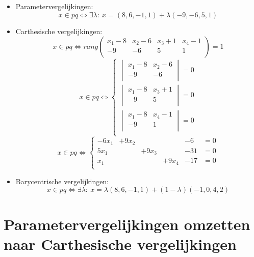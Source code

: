 \documentclass[main.tex]{subfiles}
\begin{document}
\begin{itemize}
\item Parametervergelijkingen:
  \[
  x\in pq \Leftrightarrow \exists \lambda:\ 
  x = (8,6,-1,1) + \lambda (-9,-6,5,1)
  \]
\item Carthesische vergelijkingen:
  \[
  x \in pq \Leftrightarrow
  rang
  \begin{pmatrix}
    x_{1}-8 & x_{2}-6 & x_{3}+1 & x_{4}-1\\
    -9 & -6 & 5 & 1\\
  \end{pmatrix}
  =1
  \]
  \[
  x \in pq \Leftrightarrow
  \left\{
  \begin{array}{c}
    \begin{vmatrix}
      x_{1}-8 & x_{2}-6\\
      -9 & -6\\
    \end{vmatrix}
    =0\\
    \begin{vmatrix}
      x_{1}-8 & x_{3}+1\\
      -9 & 5\\
    \end{vmatrix}
    =0\\
    \begin{vmatrix}
      x_{1}-8 & x_{4}-1\\
      -9 & 1\\
    \end{vmatrix}
    =0\\
  \end{array}
  \right.
  \]
  \[ 
  x \in pq \Leftrightarrow
  \left\{
    \begin{array}{ccccccc}
      -6x_{1} &+9x_{2} &        &       & -6 &= 0\\
      5x_{1}  &       &+9x_{3}  &       &-31 &= 0\\
      x_{1}   &       &        &+9x_{4} &-17 &= 0\\
    \end{array}
  \right.
  \]
\item Barycentrische vergelijkingen:
  \[
  x\in pq \Leftrightarrow \exists \lambda:\ 
  x = \lambda (8,6,-1,1) + (1- \lambda)(-1,0,4,2)
  \]
\end{itemize}

\newpage
\section{Parametervergelijkingen omzetten naar Carthesische vergelijkingen}
\end{document}
